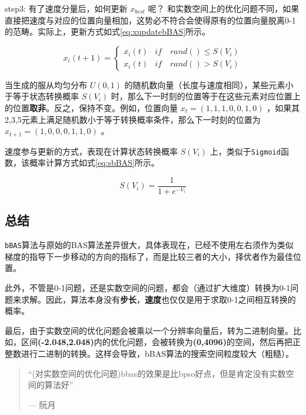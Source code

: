 \documentclass[]{ctexbook}
\begin{document}
step3: 有了速度分量后，如何更新 \(x_{best}\) 呢？
和实数空间上的优化问题不同，如果直接把速度与对应的位置向量相加，这势必不符合会使得原有的位置向量脱离0-1的范畴。实际上，更新方式如式\eqref{eq:xupdatebBAS}所示。

\begin{equation}
x_i(t+1)=\begin{cases} 
\overline{x_i}(t) & if\quad rand() \leq S(V_i)\\ 
x_i(t) & if\quad rand() > S(V_i) 
\end{cases} 
\label{eq:xupdatebBAS} 
\end{equation}

当生成的服从均匀分布 \(U(0,1)\)
的随机数向量（长度与速度相同），某些元素小于等于状态转换概率 \(S(V_i)\)
时，那么下一时刻的位置等于在这些元素对应位置上的位置\textbf{取非}。反之，保持不变。例如，位置向量
\(x_t = (1,1,1,0,0,1,0)\) ，如果其
2,3,5元素上满足随机数小于等于转换概率条件，那么下一时刻的位置为
\(x_{t+1}=(1,0,0,0,1,1,0)\) 。

速度参与更新的方式，表现在计算状态转换概率 \(S(V_i)\)
上，类似于\texttt{Sigmoid}函数，该概率计算方式如式\eqref{eq:sbBAS}所示。

\begin{equation}
S(V_i) = \frac{1}{1+e^{-V_i}}
\label{eq:sbBAS}
\end{equation}

\subsection{总结}\label{-1}

\texttt{bBAS}算法与原始的BAS算法差异很大，具体表现在，已经不使用左右须作为类似梯度的指导下一步移动的方向的指标了，而是比较三者的大小，择优者作为最佳位置。

此外，不管是0-1问题，还是实数空间的问题，都会（通过扩大维度）转换为0-1问题来求解。因此，算法本身没有\textbf{步长}，\textbf{速度}也仅仅是用于求取0-1之间相互转换的概率。

最后，由于实数空间的优化问题会被乘以一个分辨率向量后，转为二进制向量。比如，区间\textbf{(-2.048,2.048)}内的优化问题，会被转换为\textbf{(0,4096)}的空间，然后再把正整数进行二进制的转换。这样会导致，bBAS算法的搜索空间粒度较大（粗糙）。

\begin{quote}
``(对实数空间的优化问题)bbas的效果是比bpso好点，但是肯定没有实数空间的算法好''

\begin{flushright}--- 阮月\end{flushright}
\end{quote}
\end{document}
